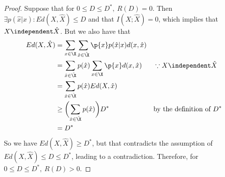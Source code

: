\documentclass[
  coursecode={MTHE 477},
  assignmentname={Homework \homeworknumber},
  studentnumber=20053722,
  name={Bryan Hoang},
  draft,
]{
  ltxanswer%
}
\begin{document}
\begin{questions}
\begin{parts}
\begin{solution}
\begin{proof}
          Suppose that for \(0 \le D \le D^{*},\ R(D) = 0\). Then \(\exists p(\hat{x}|x) : Ed(X,\hat{X}) \le D\) and that \(I(X;\hat{X}) = 0\), which implies that \(X \independent \hat{X}\). But we also have that
          \begin{align*}
            Ed(X,\hat{X}) &= \sum_{x\in\X} \sum_{\hat{x}\in\hat{\X}} \p{x} p(\hat{x}|x) d(x,\hat{x})                                          \\
                          &= \sum_{\hat{x}\in\hat{\X}} p(\hat{x}) \sum_{x\in\X} \p{x} d(x,\hat{x})   & &\because X \independent \hat{X}       \\
                          &= \sum_{\hat{x}\in\hat{\X}} p(\hat{x}) Ed(X,\hat{x})                                                               \\
                          &\ge \biggl(\sum_{\hat{x}\in\hat{\X}} p(\hat{x})\biggr) D^{*}              & &\text{by the definition of \(D^{*}\)} \\
                          &= D^{*}
          \end{align*}
          So we have \(Ed(X,\hat{X}) \ge D^{*}\), but that contradicts the assumption of \(Ed(X,\hat{X}) \le D \le D^{*}\), leading to a contradiction. Therefore, for \(0 \le D \le D^{*},\ R(D) > 0\).
        \end{proof}
      \end{solution}
    \end{parts}
  \end{questions}
\end{document}
